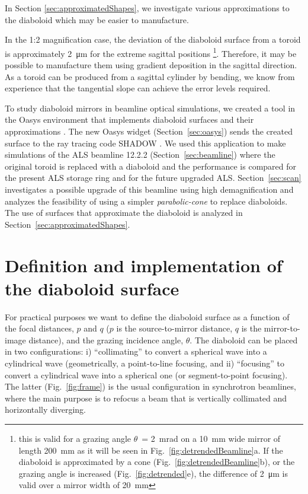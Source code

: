 \documentclass[preprint]{iucr}       %
\newcommand{\inred}[1]{{\color{red}#1}}
\begin{document}
In Section \ref{sec:approximatedShapes}, we investigate various approximations to the diaboloid which may be easier to manufacture.

In the 1:2 magnification case, the deviation of the diaboloid surface from a toroid is approximately \SI{2}{\micro\meter} for the extreme sagittal positions
\footnote{\inred{this is valid for a grazing angle $\theta$~= \SI{2}{\milli\radian} on a \SI{10}{\milli\meter} wide mirror of length \SI{200}{\milli\meter} as it will be seen in Fig.~\ref{fig:detrendedBeamline}a. If the diaboloid is approximated by a cone (Fig.~\ref{fig:detrendedBeamline}b), or the grazing angle is increased (Fig.~\ref{fig:detrended}e), the difference of \SI{2}{\micro\meter} is valid over a mirror width of \SI{20}{\milli\meter} }}. Therefore, it may be possible to manufacture them using gradient deposition in the sagittal direction. As a toroid can be produced from a sagittal cylinder by bending, we know from experience that the tangential slope can achieve the error levels required.


To study diaboloid mirrors in beamline optical simulations, we created a tool in the Oasys environment \cite{codeOASYS} that implements diaboloid surfaces and their approximations \cite{valSPIE} \cite{val2021}. The new Oasys widget (Section~\ref{sec:oasys}) sends the created surface to the ray tracing code SHADOW \cite{codeSHADOW}. We used this application to make simulations of the ALS beamline 12.2.2 (Section~\ref{sec:beamline}) where the original toroid is replaced with a diaboloid and the performance is compared for the present ALS storage ring and for the future upgraded ALS. Section~\ref{sec:scan} investigates a possible upgrade of this beamline using high demagnification and analyzes the feasibility of using a simpler \emph{parabolic-cone} to replace diaboloids. The use of surfaces that approximate the diaboloid is analyzed in Section~\ref{sec:approximatedShapes}.

\section{Definition and implementation of the diaboloid surface}
\label{sec:DiaboloidEqs}

For practical purposes we want to define the diaboloid surface as a function of the focal distances, $p$ and $q$ ($p$ is the source-to-mirror distance, $q$ is the mirror-to-image distance), and the grazing incidence angle, $\theta$. The diaboloid can be placed in two configurations: i) ``collimating'' to convert a spherical wave into a cylindrical wave (geometrically, a point-to-line focusing, and ii) ``focusing'' to convert a cylindrical wave into a spherical one (or segment-to-point focusing). The latter (Fig.~\ref{fig:frame}) is the usual configuration in synchrotron beamlines, where the main purpose is to refocus a beam that is vertically collimated and horizontally diverging. 
\end{document}
